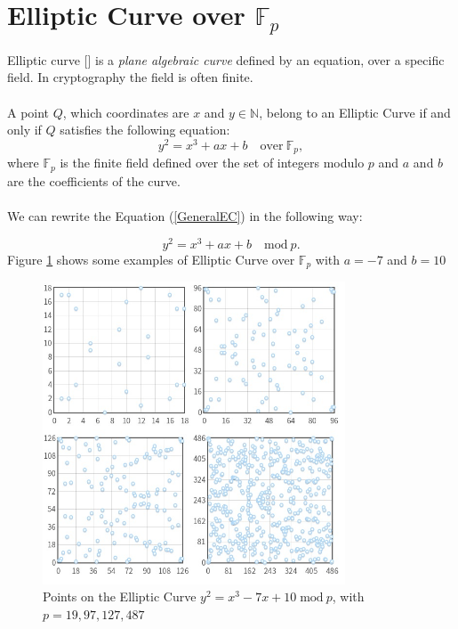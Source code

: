 \section{Elliptic Curve over $\mathbb{F}_p$}
Elliptic curve [\cite{7,8,9,10}] is a \textit{plane algebraic curve} defined by an equation, over a specific field. In cryptography the field is often finite.
\\ \\
A point $Q$, which coordinates are $x$ and $y\in \mathbb{N}$, belong to an Elliptic Curve if and only if $Q$ satisfies the following equation:
\begin{equation}\label{GeneralEC}
y^2=x^3+ax+b \quad \textrm{over} \ \mathbb{F}_p,
\end{equation}
where $\mathbb{F}_p$ is the finite field defined over the set of integers modulo $p$ and $a$ and $b$ are the coefficients of the curve. \\ \\
We can rewrite the Equation (\ref{GeneralEC}) in the following way:

\begin{equation}\label{GeneralECmodp}
y^2=x^3+ax+b \quad \textrm{mod} \ p.
\end{equation}
Figure \ref{fig:EC_ex} shows some examples of Elliptic Curve over $\mathbb{F}_p$ with $a=-7$ and $b=10$
\begin{figure}[ht!]
	\centering
	\includegraphics[width=9cm]{Figures/EC_ex.jpg}
	\caption{Points on the Elliptic Curve $y^2=x^3-7x+10 \; \textrm{mod} \ p$, with $p=19,97,127,487$ }
	\label{fig:EC_ex}
\end{figure}

